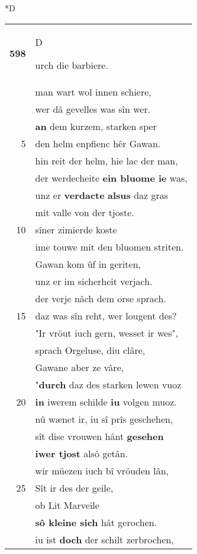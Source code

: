 \documentclass[8pt,a4paper,notitlepage]{article}
\begin{document}
\begin{table}[ht]
\begin{minipage}[t]{0.5\linewidth}
\small
\begin{center}*D
\end{center}
\begin{tabular}{rl}
\textbf{598} & \begin{large}D\end{large}urch die barbiere.\\ 
 & man wart wol innen schiere,\\ 
 & wer dâ gevelles was sîn wer.\\ 
 & \textbf{an} dem kurzem, starken sper\\ 
5 & den helm enpfienc hêr Gawan.\\ 
 & hin reit der helm, hie lac der man,\\ 
 & der werdecheite \textbf{ein bluome ie} was,\\ 
 & unz er \textbf{verdacte} \textbf{alsus} daz gras\\ 
 & mit valle von der tjoste.\\ 
10 & sîner zimierde koste\\ 
 & ime touwe mit den bluomen striten.\\ 
 & Gawan kom ûf in geriten,\\ 
 & unz er im sicherheit verjach.\\ 
 & der verje nâch dem orse sprach.\\ 
15 & daz was sîn reht, wer lougent des?\\ 
 & "Ir vröut iuch gern, wesset ir wes",\\ 
 & sprach Orgeluse, diu clâre,\\ 
 & Gawane aber ze vâre,\\ 
 & "\textbf{durch} daz des starken lewen vuoz\\ 
20 & \textbf{in} iwerem schilde \textbf{iu} volgen muoz.\\ 
 & nû wænet ir, iu sî prîs geschehen,\\ 
 & sît dise vrouwen hânt \textbf{gesehen}\\ 
 & \textbf{iwer tjost} alsô getân.\\ 
 & wir müezen iuch bî vröuden lân,\\ 
25 & Sît ir des der geile,\\ 
 & ob Lit Marveile\\ 
 & \textbf{sô kleine sich} hât gerochen.\\ 
 & iu ist \textbf{doch} der schilt zerbrochen,\\ 

\end{tabular}
\end{minipage}
\end{table}
\end{document}
